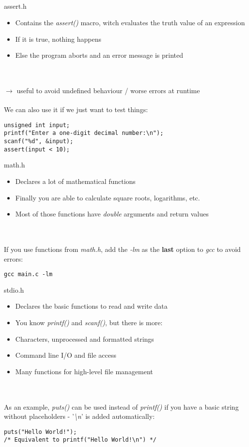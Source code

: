 \subsection{}
\begin{frame}[fragile]{assert.h}
	 \begin{itemize}
	 	\item Contains the \textit{assert()} macro, witch evaluates the truth value of an expression
	 	\item If it is true, nothing happens
	 	\item Else the program aborts and an error message is printed
	 \end{itemize} \ \\ \ \\
	 $\rightarrow$ useful to avoid undefined behaviour / worse errors at runtime \\ \ \\
	 We can also use it if we just want to test things:
	 \begin{lstlisting}[numbers=none]
unsigned int input;
printf("Enter a one-digit decimal number:\n");
scanf("%d", &input);
assert(input < 10);
\end{lstlisting}
\end{frame}
\begin{frame}[fragile]{math.h}
	\begin{itemize}
		\item Declares a lot of mathematical functions
		\item Finally you are able to calculate square roots, logarithms, etc.
		\item Most of those functions have \textit{double} arguments and return values
	\end{itemize} \ \\ \ \\
	If you use functions from \textit{math.h}, add the \textit{-lm} as the \textbf{last} option to \textit{gcc} to avoid errors:
	\begin{lstlisting}[numbers=none]
gcc main.c -lm
\end{lstlisting}
\end{frame}
\begin{frame}[fragile]{stdio.h}
	\begin{itemize}
		\item Declares the basic functions to read and write data
		\item You know \textit{printf()} and \textit{scanf()}, but there is more:
		\item Characters, unprocessed and formatted strings
		\item Command line I/O and file access
		\item Many functions for high-level file management
	\end{itemize} \ \\ \ \\
	As an example, \textit{puts()} can be used instead of \textit{printf()} if you have a basic string without placeholders - '\textit{\textbackslash n}' is added automatically:
	\begin{lstlisting}[numbers=none]
puts("Hello World!");
/* Equivalent to printf("Hello World!\n") */
\end{lstlisting}
\end{frame}
